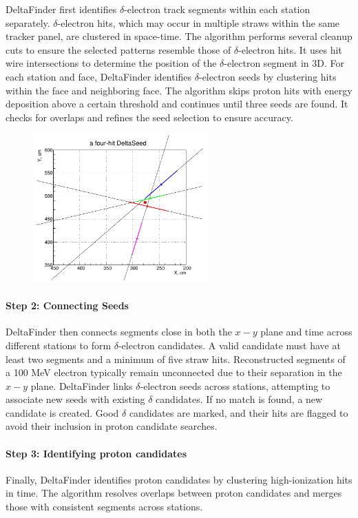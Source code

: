 DeltaFinder first identifies $\delta$-electron track segments within 
each station separately. $\delta$-electron hits, which may occur in multiple 
straws within the same tracker panel, are clustered in space-time. The algorithm 
performs several cleanup cuts to ensure the selected patterns resemble 
those of $\delta$-electron hits. It uses hit wire intersections to determine the position 
of the $\delta$-electron segment in 3D.
For each station and face, DeltaFinder identifies $\delta$-electron seeds by 
clustering hits within the face and neighboring face. The algorithm skips proton 
hits with energy deposition above a certain threshold and continues until three 
seeds are found. It checks for overlaps and refines the seed selection to ensure accuracy.
\begin{figure}[!h]
    \centering
    \includegraphics[width =0.6\textwidth]{figures/png/Screenshot_20240811_115854.png}
    \caption[]{    }
    \label{fig:deltaseeds}
\end{figure}
\paragraph{Step 2: Connecting Seeds}
DeltaFinder then connects segments close in both the $x-y$ plane and 
time across different stations to form $\delta$-electron candidates. 
A valid candidate must have at least two segments and a minimum of five straw hits. 
Reconstructed segments of a 100 MeV electron typically remain unconnected 
due to their separation in the $x-y$ plane.
DeltaFinder links $\delta$-electron seeds across stations, attempting to 
associate new seeds with existing $\delta$ candidates. If no match is found, a new candidate is created.
Good $\delta$ candidates are marked, and their hits are flagged 
to avoid their inclusion in proton candidate searches.


\paragraph{Step 3: Identifying proton candidates}
Finally, DeltaFinder identifies proton candidates by clustering high-ionization 
hits in time. The algorithm resolves overlaps between proton candidates and 
merges those with consistent segments across stations.

